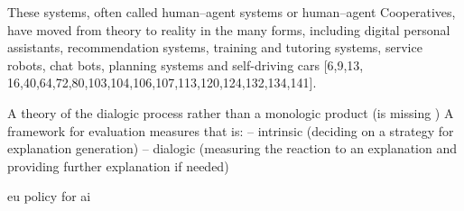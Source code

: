 These systems, often called human–agent systems or human–agent Cooperatives, have moved from theory to reality in the many forms, including digital personal assistants, recommendation systems, training and tutoring systems, service robots, chat bots, planning systems and self-driving cars [6,9,13, 16,40,64,72,80,103,104,106,107,113,120,124,132,134,141].

A theory of the dialogic process rather than a monologic product (is missing \cite{cassens_ambient_2019}) A framework for evaluation measures that is: – intrinsic (deciding on a strategy for explanation generation) – dialogic (measuring the reaction to an explanation and providing further explanation if needed)

\cite{hleg2019policy} eu policy for ai